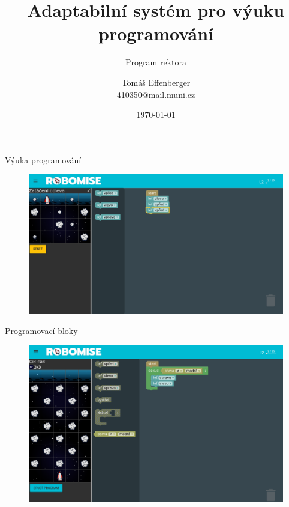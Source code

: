 \documentclass[
]{beamer}
\begin{document}
\title{Adaptabilní systém pro výuku programování}
\subtitle{Program rektora}
\author[T.\,Effenberger]{Tomáš Effenberger\\ 410350@mail.muni.cz}
\date{\today}
\subject{Předmět prezentace}

\begin{frame}[plain]
\maketitle
\end{frame}


\begin{frame}{Výuka programování}
\begin{figure}
\includegraphics[width=\textwidth,height=.75\textheight,keepaspectratio]{../img/robomission-task1}
\end{figure}
\end{frame}

\begin{frame}{Programovací bloky}
\begin{figure}
\includegraphics[width=\textwidth,height=.75\textheight,keepaspectratio]{../img/robomission-task2}
\end{figure}
\end{frame}
\end{document}

